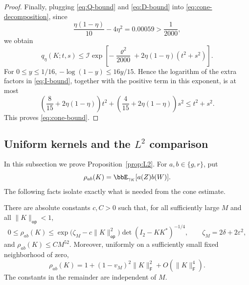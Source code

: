 \documentclass[11pt,reqno]{amsart}
\begin{document}
\begin{proof}
Finally, plugging \eqref{eq:Q-bound} and \eqref{eq:D-bound} into \eqref{eq:cone-decomposition}, since
\[
 \frac{\eta(1-\eta)}{10}-4\eta^2
 =0.00059>\frac1{2000},
\]
we obtain
\[
 q_\eta(K;t,s)\le\mathcal I
 \exp\left[-\frac{\varrho^2}{2000}+2\eta(1-\eta)(t^2+s^2)\right].
\]
For $0\le y\le1/16$, $-\log(1-y)\le16y/15$. Hence the logarithm of the extra factors in \eqref{eq:I-bound}, together with the positive term in this exponent, is at most
\[
 \left(\frac8{15}+2\eta(1-\eta)\right)t^2+
 \left(\frac4{15}+2\eta(1-\eta)\right)s^2
 \le t^2+s^2.
\] This proves \eqref{eq:cone-bound}.
\end{proof}

\subsection{Uniform kernels and the $L^2$ comparison}

In this subsection we prove Proposition~\ref{prop:L2}.
For $a,b\in\{g,r\}$, put
\[
 \rho_{ab}(K)=\bbE_{\gamma_K}[a(Z)b(W)].
\]
The following facts isolate exactly what is needed from the cone estimate.

\begin{lem}\label{lem:kernels}
There are absolute constants $c,C>0$ such that, for all sufficiently large $M$ and all $\|K\|_{\mathsf{op}}<1$,
\begin{equation}\label{eq:global-kernel}
 0\le\rho_{ab}(K)\le
 \exp\bigl(\zeta_M-c\|K\|_{\mathsf{op}}^2\bigr)\det(I_2-KK^*)^{-1/4},
 \qquad \zeta_M=2\delta+2\varepsilon^2,
\end{equation}
and $\rho_{ab}(K)\le C M^{52}$. Moreover, uniformly on a sufficiently small fixed neighborhood of zero,
\begin{equation}\label{eq:local-kernel}
 \rho_{ab}(K)=1+(1-v_M)^2\|K\|_{\mathsf{F}}^2+O(\|K\|_{\mathsf{F}}^4).
\end{equation}
The constants in the remainder are independent of $M$.
\end{lem}
\end{document}
